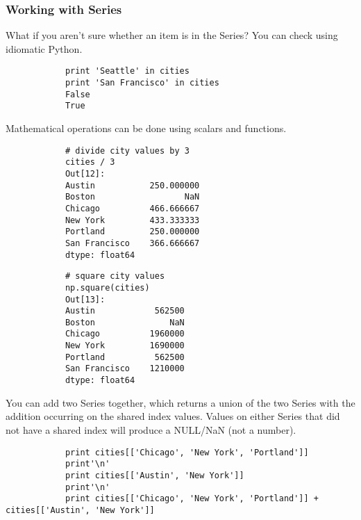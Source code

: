 \documentclass[KSmainSlides.tex]{subfiles}
\begin{document}
	\begin{frame}[fragile]
		\frametitle{Working with Series}
		What if you aren't sure whether an item is in the Series? You can check using idiomatic Python.
		
		\begin{framed}
			\begin{verbatim}
			print 'Seattle' in cities
			print 'San Francisco' in cities
			False
			True
			\end{verbatim}
		\end{framed}
	\end{frame}
	\begin{frame}[fragile]
		Mathematical operations can be done using scalars and functions.
		
		\begin{framed}
			\begin{verbatim}
			# divide city values by 3
			cities / 3
			Out[12]:
			Austin           250.000000
			Boston                  NaN
			Chicago          466.666667
			New York         433.333333
			Portland         250.000000
			San Francisco    366.666667
			dtype: float64
			\end{verbatim}
		\end{framed}
	\end{frame}
	\begin{frame}[fragile]
		\begin{framed}
			\begin{verbatim}
			# square city values
			np.square(cities)
			Out[13]:
			Austin            562500
			Boston               NaN
			Chicago          1960000
			New York         1690000
			Portland          562500
			San Francisco    1210000
			dtype: float64
			\end{verbatim}
		\end{framed}
	\end{frame}
	\begin{frame}[fragile]
		
		You can add two Series together, which returns a union of the two Series with the addition occurring on the shared index values. Values on either Series that did not have a shared index will produce a NULL/NaN (not a number).
		
		\begin{framed}
			\begin{verbatim}
			print cities[['Chicago', 'New York', 'Portland']]
			print'\n'
			print cities[['Austin', 'New York']]
			print'\n'
			print cities[['Chicago', 'New York', 'Portland']] + cities[['Austin', 'New York']]
			\end{verbatim}
		\end{framed}
	\end{frame}
	
\end{document}
